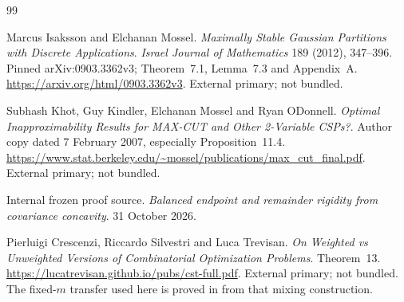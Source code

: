 \begin{thebibliography}{99}
\par{}


Marcus Isaksson and Elchanan Mossel. \emph{Maximally Stable Gaussian Partitions with Discrete Applications}. \emph{Israel Journal of Mathematics} 189 (2012), 347--396. Pinned arXiv:0903.3362v3; Theorem~7.1, Lemma~7.3 and Appendix~A. \url{https://arxiv.org/html/0903.3362v3}. External primary; not bundled.

\par{}

\par{}


Subhash Khot, Guy Kindler, Elchanan Mossel and Ryan O\textquotesingle Donnell. \emph{Optimal Inapproximability Results for MAX-CUT and Other 2-Variable CSPs?}. Author copy dated 7 February 2007, especially Proposition~11.4. \url{https://www.stat.berkeley.edu/~mossel/publications/max_cut_final.pdf}. External primary; not bundled.

\par{}

\par{}


Internal frozen proof source. \emph{Balanced endpoint and remainder rigidity from covariance concavity}. 31 October 2026.
\par{}
\par{}

Pierluigi Crescenzi, Riccardo Silvestri and Luca Trevisan.
\emph{On Weighted vs Unweighted Versions of Combinatorial Optimization Problems}.
Theorem~13. \url{https://lucatrevisan.github.io/pubs/cst-full.pdf}.
External primary; not bundled. The fixed-$m$ transfer used here is proved
in \cite[Section~4]{transfer} from that mixing construction.
\par{}
\par{}



\end{thebibliography}
